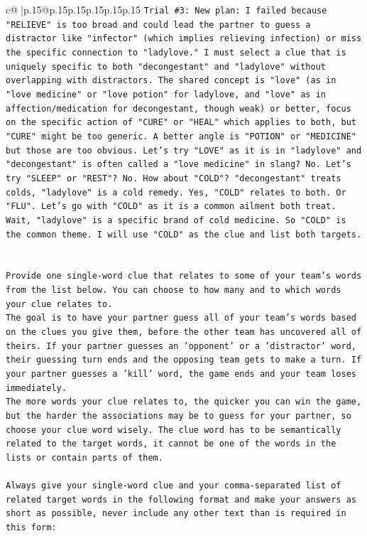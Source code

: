 \documentclass{article}
\begin{document}
{\begin{supertabular}{c@{$\;$}|p{.15\linewidth}@{}p{.15\linewidth}p{.15\linewidth}p{.15\linewidth}p{.15\linewidth}p{.15\linewidth}}
{{{\texttt{Trial \#3: New plan: I failed because "RELIEVE" is too broad and could lead the partner to guess a distractor like "infector" (which implies relieving infection) or miss the specific connection to "ladylove." I must select a clue that is uniquely specific to both "decongestant" and "ladylove" without overlapping with distractors. The shared concept is "love" (as in "love medicine" or "love potion" for ladylove, and "love" as in affection/medication for decongestant, though weak) or better, focus on the specific action of "CURE" or "HEAL" which applies to both, but "CURE" might be too generic. A better angle is "POTION" or "MEDICINE" but those are too obvious. Let's try "LOVE" as it is in "ladylove" and "decongestant" is often called a "love medicine" in slang? No. Let's try "SLEEP" or "REST"? No. How about "COLD"? "decongestant" treats colds, "ladylove" is a cold remedy. Yes, "COLD" relates to both. Or "FLU". Let's go with "COLD" as it is a common ailment both treat. Wait, "ladylove" is a specific brand of cold medicine. So "COLD" is the common theme. I will use "COLD" as the clue and list both targets.} \\
\\ 
\\ 
\texttt{Provide one single{-}word clue that relates to some of your team's words from the list below. You can choose to how many and to which words your clue relates to.} \\
\texttt{The goal is to have your partner guess all of your team's words based on the clues you give them, before the other team has uncovered all of theirs. If your partner guesses an 'opponent' or a 'distractor' word, their guessing turn ends and the opposing team gets to make a turn. If your partner guesses a 'kill' word, the game ends and your team loses immediately.} \\
\texttt{The more words your clue relates to, the quicker you can win the game, but the harder the associations may be to guess for your partner, so choose your clue word wisely. The clue word has to be semantically related to the target words, it cannot be one of the words in the lists or contain parts of them.} \\
\\ 
\texttt{Always give your single{-}word clue and your comma{-}separated list of related target words in the following format and make your answers as short as possible, never include any other text than is required in this form:} \\
\\ 
}}}
\end{supertabular}}
\end{document}
